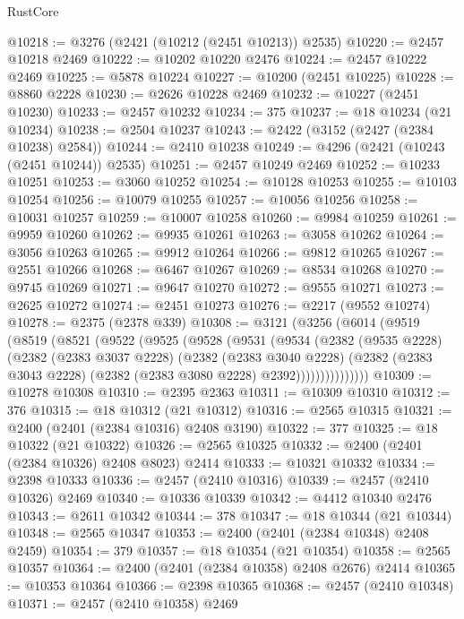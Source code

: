 \begin{lexlean}{RustCore}
\begin{coremodule}
@10218 := @3276 (@2421 (@10212 (@2451 @10213)) @2535)
@10220 := @2457 @10218 @2469
@10222 := @10202 @10220 @2476
@10224 := @2457 @10222 @2469
@10225 := @5878 @10224
@10227 := @10200 (@2451 @10225)
@10228 := @8860 @2228
@10230 := @2626 @10228 @2469
@10232 := @10227 (@2451 @10230)
@10233 := @2457 @10232
@10234 := 375
@10237 := @18 @10234 (@21 @10234)
@10238 := @2504 @10237
@10243 := @2422 (@3152 (@2427 (@2384 @10238) @2584))
@10244 := @2410 @10238
@10249 := @4296 (@2421 (@10243 (@2451 @10244)) @2535)
@10251 := @2457 @10249 @2469
@10252 := @10233 @10251
@10253 := @3060 @10252
@10254 := @10128 @10253
@10255 := @10103 @10254
@10256 := @10079 @10255
@10257 := @10056 @10256
@10258 := @10031 @10257
@10259 := @10007 @10258
@10260 := @9984 @10259
@10261 := @9959 @10260
@10262 := @9935 @10261
@10263 := @3058 @10262
@10264 := @3056 @10263
@10265 := @9912 @10264
@10266 := @9812 @10265
@10267 := @2551 @10266
@10268 := @6467 @10267
@10269 := @8534 @10268
@10270 := @9745 @10269
@10271 := @9647 @10270
@10272 := @9555 @10271
@10273 := @2625 @10272
@10274 := @2451 @10273
@10276 := @2217 (@9552 @10274)
@10278 := @2375 (@2378 @339)
@10308 := @3121
    (@3256
      (@6014
        (@9519
          (@8519
            (@8521
              (@9522
                (@9525
                  (@9528
                    (@9531
                      (@9534
                        (@2382
                          (@9535 @2228)
                          (@2382
                            (@2383 @3037 @2228)
                            (@2382
                              (@2383 @3040 @2228)
                              (@2382
                                (@2383 @3043 @2228)
                                (@2382 (@2383 @3080 @2228) @2392)))))))))))))))
@10309 := @10278 @10308
@10310 := @2395 @2363
@10311 := @10309 @10310
@10312 := 376
@10315 := @18 @10312 (@21 @10312)
@10316 := @2565 @10315
@10321 := @2400 (@2401 (@2384 @10316) @2408 @3190)
@10322 := 377
@10325 := @18 @10322 (@21 @10322)
@10326 := @2565 @10325
@10332 := @2400 (@2401 (@2384 @10326) @2408 @8023) @2414
@10333 := @10321 @10332
@10334 := @2398 @10333
@10336 := @2457 (@2410 @10316)
@10339 := @2457 (@2410 @10326) @2469
@10340 := @10336 @10339
@10342 := @4412 @10340 @2476
@10343 := @2611 @10342
@10344 := 378
@10347 := @18 @10344 (@21 @10344)
@10348 := @2565 @10347
@10353 := @2400 (@2401 (@2384 @10348) @2408 @2459)
@10354 := 379
@10357 := @18 @10354 (@21 @10354)
@10358 := @2565 @10357
@10364 := @2400 (@2401 (@2384 @10358) @2408 @2676) @2414
@10365 := @10353 @10364
@10366 := @2398 @10365
@10368 := @2457 (@2410 @10348)
@10371 := @2457 (@2410 @10358) @2469

\end{coremodule}
\end{lexlean}
